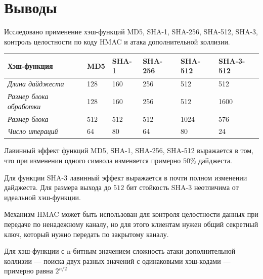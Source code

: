 \documentclass[a4paper, 14pt]{extarticle}
\begin{document}
\section*{Выводы}
Исследовано применение хэш-функций MD5, SHA-1, SHA-256, SHA-512, SHA-3, контроль целостности по коду HMAC и атака дополнительной коллизии.

\begin{table}[h]
    \centering
    \begin{tabular}{@{}llllll@{}}
        \toprule
        \textbf{Хэш-функция}            & \textbf{MD5} & \textbf{SHA-1} & \textbf{SHA-256} & \textbf{SHA-512} & \textbf{SHA-3-512} \\ \midrule %
        \textit{Длина дайджеста}        & 128          & 160            & 256              & 512              & 512                \\
        \textit{Размер блока обработки} & 128          & 160            & 256              & 512              & 1600               \\
        \textit{Размер блока}           & 512          & 512            & 512              & 1024             & 576                \\
        \textit{Число итераций}         & 64           & 80             & 64               & 80               & 24                 \\ \bottomrule
    \end{tabular}
\end{table}

Лавинный эффект функций MD5, SHA-1, SHA-256, SHA-512 выражается в том, что при изменении одного символа изменяется примерно $50\%$ дайджеста.

Для функции SHA-3 лавинный эффект выражается в почти полном изменении дайджеста. Для размера выхода до $512$ бит стойкость SHA-3 неотличима от идеальной хэш-функции.

Механизм HMAC может быть использован для контроля целостности данных при передаче по ненадежному каналу, но для этого клиентам нужен общий секретный ключ, который нужно передать по закрытому каналу.

Для хэш-функции с n-битным значением сложность атаки дополнительной коллизии --- поиска двух разных значений с одинаковыми хэш-кодами --- примерно равна $2^{n/2}$
\end{document}
